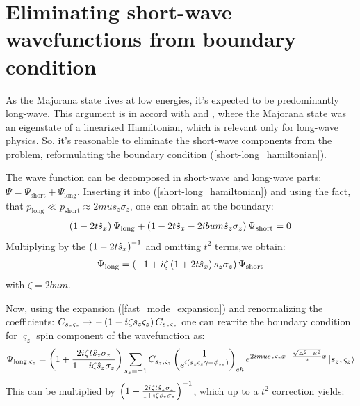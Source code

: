 \section{Eliminating short-wave wavefunctions from boundary condition}
\label{sec:elimintaing_long-wave}


	As the Majorana state lives at low energies, it's expected to be predominantly long-wave. This argument is in accord with \cite{Oreg_2010} and \cite{Lutchyn_2010}, where the Majorana state was an eigenstate of a linearized Hamiltonian, which is relevant only for long-wave physics. So, it's reasonable to eliminate the short-wave components from the problem, reformulating the boundary condition (\ref{short-long_hamiltonian}).

The wave function can be decomposed in short-wave and  long-wave  parts: $ \Psi = \Psi_{\mathrm{short}}+\Psi_{\mathrm{long}} $. Inserting it into (\ref{short-long_hamiltonian}) and using the fact, that $ p_{\mathrm{
long}}\ll p_{\mathrm{short}} \approx 2mu s_z \sigma_z $, one can obtain at the boundary:
\begin{gather}
	\left(1-2t\hat{s}_x\right)\Psi_{\mathrm{long}}+\left(1-2t\hat{s}_x-2ibum\hat{s}_z \sigma_z\right)\Psi_{\mathrm{short}}=0
\end{gather}
Multiplying by the $ \left(1-2t\hat{s}_x\right)^{-1} $ and omitting $ {t^2} $ terms,we obtain:
\begin{gather}
	\Psi_{\mathrm{long}}
	=
	\left(-1+i\zeta\left(1+2t\hat{s}_x\right)s_z \sigma_z\right)\Psi_{\mathrm{short}}
\end{gather}
with $ \zeta=2bum $.

Now, using the expansion (\ref{fast_mode_expansion}) and renormalizing the coefficients: $ C_{s_z \varsigma_z}\to-\left(1-i\zeta s_z \varsigma_z\right)C_{s_z \varsigma_z} $ one can rewrite the boundary condition for $ \varsigma_z $ spin component of the wavefunction as:
\begin{gather}
\Psi_{\mathrm{long},\varsigma_z}
=
\left(1+\frac{2i\zeta t\hat{s}_z\sigma_z}{1+i\zeta \hat{s}_z\sigma_z}\right)
\sum_{s_z=\pm1}
C_{s_z,\varsigma_z}
		\begin{pmatrix}
	1
	\\
	e^{i\left(s_z\varsigma_z\gamma+\phi_{s_z}\right)}
	\end{pmatrix}_{eh}
	e^{2imus_z\varsigma_zx -\frac{\sqrt{\Delta^2-E^2}}{u}x}
	\ket{s_z, \varsigma_z}
\end{gather}
This can be  multiplied by $ \left(1+\frac{2i\zeta t\hat{s}_z\sigma_z}{1+i\zeta \hat{s}_z\sigma_z}\right)^{-1} $, which up to a $ t^2 $ correction yields:

